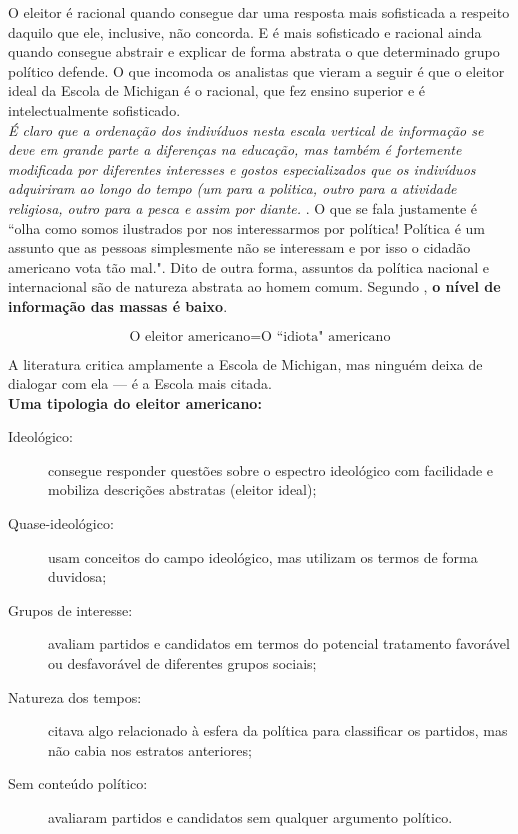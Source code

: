 \noindent O eleitor é racional quando consegue dar uma resposta mais sofisticada a respeito daquilo que ele, inclusive, não concorda. E é mais sofisticado e racional ainda quando consegue abstrair e explicar de forma abstrata o que determinado grupo político defende. O que incomoda os analistas que vieram a seguir é que o eleitor ideal da Escola de Michigan é o racional, que fez ensino superior e é intelectualmente sofisticado. \\

\noindent \textit{É claro que a ordenação dos indivíduos nesta escala vertical de informação se deve em grande parte a diferenças na educação, mas também é fortemente modificada por diferentes interesses e gostos especializados que os indivíduos adquiriram ao longo do tempo (um para a politica, outro para a atividade religiosa, outro para a pesca e assim por diante.} \cite[~p. 10]{converse_1964}. O que se fala justamente é ``olha como somos ilustrados por nos interessarmos por política! Política é um assunto que as pessoas simplesmente não se interessam e por isso o cidadão americano vota tão mal.". Dito de outra forma, assuntos da política nacional e internacional são de natureza abstrata ao homem comum. Segundo , \textbf{o nível de informação das massas é baixo}.

$$ \text{O \ eleitor \ americano} = \text{O \ ``idiota" \ americano} $$

\noindent A literatura critica amplamente a Escola de Michigan, mas ninguém deixa de dialogar com ela --- é a Escola mais citada. \\

\noindent \textbf{Uma tipologia do eleitor americano:}

\begin{description}
    \item [Ideológico:] consegue responder questões sobre o espectro ideológico com facilidade e mobiliza descrições abstratas (eleitor ideal);
    \item [Quase-ideológico:] usam conceitos do campo ideológico, mas utilizam os termos de forma duvidosa;
    \item [Grupos de interesse:] avaliam partidos e candidatos em termos do potencial tratamento favorável ou desfavorável de diferentes grupos sociais;
    \item [Natureza dos tempos:] citava algo relacionado à esfera da política para classificar os partidos, mas não cabia nos estratos anteriores;
    \item [Sem conteúdo político:] avaliaram partidos e candidatos sem qualquer argumento político.
\end{description}


